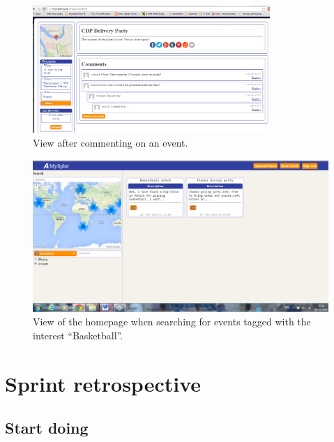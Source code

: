 \begin{figure}[ht!]
  \centering
  \includegraphics[width=90mm]{Sprint5/img/test6.png}
  \caption{View after commenting on an event. }
  \label{fig:S5TestAfterComment}
\end{figure}

\begin{figure}[ht!]
  \centering
  \includegraphics[width=\linewidth]{Sprint5/img/test7.png}
  \caption{View of the homepage when searching for events tagged with the interest ``Basketball''. }
  \label{fig:S5TestAfterComment}
\end{figure}

\newpage
\section{Sprint retrospective}
\label{sec:S5Retrospective}


\subsection{Start doing}
\label{subsec:S5RetrospectiveStart}


